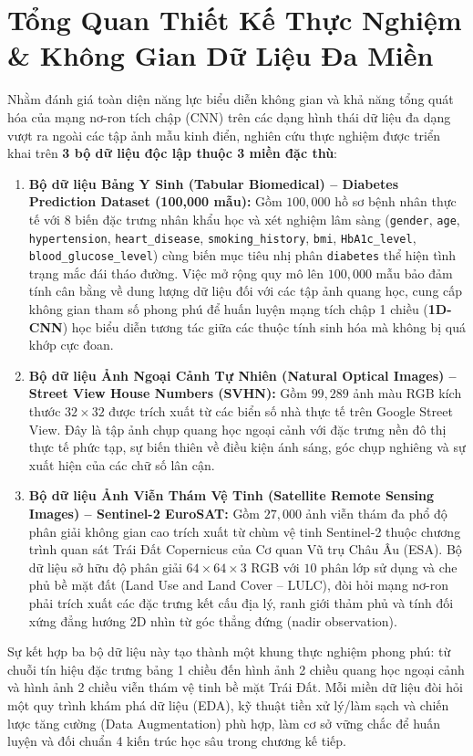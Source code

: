 \documentclass[12pt,a4paper]{report}
\begin{document}
\section{Tổng Quan Thiết Kế Thực Nghiệm \& Không Gian Dữ Liệu Đa Miền}
Nhằm đánh giá toàn diện năng lực biểu diễn không gian và khả năng tổng quát hóa của mạng nơ-ron tích chập (CNN) trên các dạng hình thái dữ liệu đa dạng vượt ra ngoài các tập ảnh mẫu kinh điển, nghiên cứu thực nghiệm được triển khai trên \textbf{3 bộ dữ liệu độc lập thuộc 3 miền đặc thù}:
\begin{enumerate}[leftmargin=*]
    \item \textbf{Bộ dữ liệu Bảng Y Sinh (Tabular Biomedical) -- Diabetes Prediction Dataset (100,000 mẫu):} Gồm $100,000$ hồ sơ bệnh nhân thực tế với $8$ biến đặc trưng nhân khẩu học và xét nghiệm lâm sàng (\texttt{gender}, \texttt{age}, \texttt{hypertension}, \texttt{heart\_disease}, \texttt{smoking\_history}, \texttt{bmi}, \texttt{HbA1c\_level}, \texttt{blood\_glucose\_level}) cùng biến mục tiêu nhị phân \texttt{diabetes} thể hiện tình trạng mắc đái tháo đường. Việc mở rộng quy mô lên $100,000$ mẫu bảo đảm tính cân bằng về dung lượng dữ liệu đối với các tập ảnh quang học, cung cấp không gian tham số phong phú để huấn luyện mạng tích chập 1 chiều (\textbf{1D-CNN}) học biểu diễn tương tác giữa các thuộc tính sinh hóa mà không bị quá khớp cực đoan.
    \item \textbf{Bộ dữ liệu Ảnh Ngoại Cảnh Tự Nhiên (Natural Optical Images) -- Street View House Numbers (SVHN):} Gồm $99,289$ ảnh màu RGB kích thước $32 \times 32$ được trích xuất từ các biển số nhà thực tế trên Google Street View. Đây là tập ảnh chụp quang học ngoại cảnh với đặc trưng nền đô thị thực tế phức tạp, sự biến thiên về điều kiện ánh sáng, góc chụp nghiêng và sự xuất hiện của các chữ số lân cận.
    \item \textbf{Bộ dữ liệu Ảnh Viễn Thám Vệ Tinh (Satellite Remote Sensing Images) -- Sentinel-2 EuroSAT:} Gồm $27,000$ ảnh viễn thám đa phổ độ phân giải không gian cao trích xuất từ chùm vệ tinh Sentinel-2 thuộc chương trình quan sát Trái Đất Copernicus của Cơ quan Vũ trụ Châu Âu (ESA). Bộ dữ liệu sở hữu độ phân giải $64 \times 64 \times 3$ RGB với $10$ phân lớp sử dụng và che phủ bề mặt đất (Land Use and Land Cover -- LULC), đòi hỏi mạng nơ-ron phải trích xuất các đặc trưng kết cấu địa lý, ranh giới thảm phủ và tính đối xứng đẳng hướng 2D nhìn từ góc thẳng đứng (nadir observation).
\end{enumerate}

Sự kết hợp ba bộ dữ liệu này tạo thành một khung thực nghiệm phong phú: từ chuỗi tín hiệu đặc trưng bảng 1 chiều đến hình ảnh 2 chiều quang học ngoại cảnh và hình ảnh 2 chiều viễn thám vệ tinh bề mặt Trái Đất. Mỗi miền dữ liệu đòi hỏi một quy trình khám phá dữ liệu (EDA), kỹ thuật tiền xử lý/làm sạch và chiến lược tăng cường (Data Augmentation) phù hợp, làm cơ sở vững chắc để huấn luyện và đối chuẩn 4 kiến trúc học sâu trong chương kế tiếp.
\end{document}
